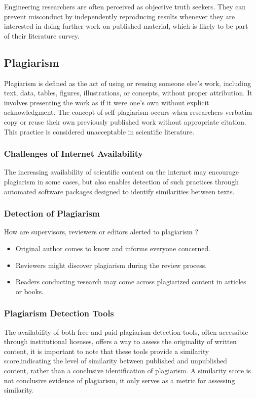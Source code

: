 \documentclass{article}
\begin{document}
	\noindent Engineering researchers are often perceived as objective truth seekers.
	They can prevent misconduct by independently reproducing results whenever they are interested in doing
	further work on published material, which is likely to be part of their literature survey.

	\subsection{Plagiarism}
	Plagiarism is defined as the act of using or reusing someone else's work, including text, data, tables,
	figures, illustrations, or concepts, without proper attribution.
	It involves presenting the work as if it were one's own without explicit acknowledgment.
	The concept of self-plagiarism occurs when researchers verbatim copy or reuse their own previously
	published work without appropriate citation. This practice is considered unacceptable in scientific
	literature.

	\subsubsection{Challenges of Internet Availability}
	The increasing availability of scientific content on the internet may encourage plagiarism in some cases,
	but also enables detection of such practices through automated software packages designed to identify
	similarities between texts.

	\subsubsection{Detection of Plagiarism}
	How are supervisors, reviewers or editors alerted to plagiarism ?

	\begin{itemize}
		\item Original author comes to know and informs everyone concerned.
		\item Reviewers might discover plagiarism during the review process.
		\item Readers conducting research may come across plagiarized content in articles or books.
	\end{itemize}

	\subsubsection{Plagiarism Detection Tools}
	The availability of both free and paid plagiarism detection tools, often accessible through institutional
	licenses, offers a way to assess the originality of written content, it is important to note that these
	tools provide a similarity score,indicating the level of similarity between published and unpublished
	content, rather than a conclusive identification of plagiarism. A similarity score is not conclusive
	evidence of plagiarism, it only serves as a metric for assessing similarity.
\end{document}
